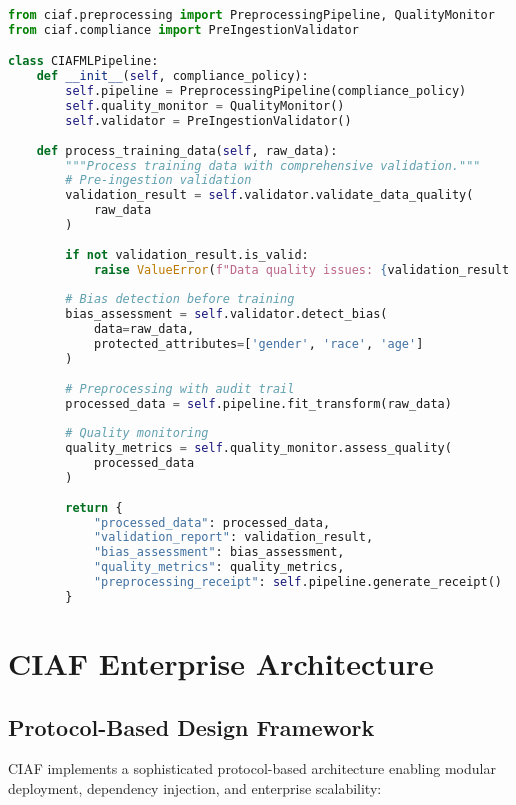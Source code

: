 \documentclass[12pt,a4paper]{article}
\begin{document}
\begin{lstlisting}[language=Python, caption=ML Pipeline Integration]
from ciaf.preprocessing import PreprocessingPipeline, QualityMonitor
from ciaf.compliance import PreIngestionValidator

class CIAFMLPipeline:
    def __init__(self, compliance_policy):
        self.pipeline = PreprocessingPipeline(compliance_policy)
        self.quality_monitor = QualityMonitor()
        self.validator = PreIngestionValidator()
    
    def process_training_data(self, raw_data):
        """Process training data with comprehensive validation."""
        # Pre-ingestion validation
        validation_result = self.validator.validate_data_quality(
            raw_data
        )
        
        if not validation_result.is_valid:
            raise ValueError(f"Data quality issues: {validation_result.issues}")
        
        # Bias detection before training
        bias_assessment = self.validator.detect_bias(
            data=raw_data,
            protected_attributes=['gender', 'race', 'age']
        )
        
        # Preprocessing with audit trail
        processed_data = self.pipeline.fit_transform(raw_data)
        
        # Quality monitoring
        quality_metrics = self.quality_monitor.assess_quality(
            processed_data
        )
        
        return {
            "processed_data": processed_data,
            "validation_report": validation_result,
            "bias_assessment": bias_assessment,
            "quality_metrics": quality_metrics,
            "preprocessing_receipt": self.pipeline.generate_receipt()
        }
\end{lstlisting}

\section{CIAF Enterprise Architecture}

\subsection{Protocol-Based Design Framework}

CIAF implements a sophisticated protocol-based architecture enabling modular deployment, dependency injection, and enterprise scalability:
\end{document}
